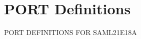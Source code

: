 \hypertarget{group___s_a_m_l21_e18_a__port}{}\section{P\+O\+R\+T Definitions}
\label{group___s_a_m_l21_e18_a__port}
P\+O\+R\+T D\+E\+F\+I\+N\+I\+T\+I\+O\+N\+S F\+O\+R S\+A\+M\+L21\+E18\+A 